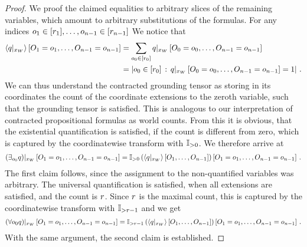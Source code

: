 \begin{proof}
    We proof the claimed equalities to arbitrary slices of the remaining variables, which amount to arbitrary substitutions of the formulas.
    For any indices $o_{1}\in[r_{1}],\ldots,o_{n-1}\in[r_{n-1}]$ We notice that
    \begin{align*}
        \left\langle {q}|_{x_{W}}\right\rangle \left[ O_{1}=o_{1},\ldots,O_{n-1}=o_{n-1} \right]
        &= \sum_{o_{0}\in[r_{0}]} {q}|_{x_{W}} \left[O_{0}=o_{0},\ldots,O_{n-1}=o_{n-1}\right] \\
        &= \left|o_{0}\in[r_{0}] \,:\, {q}|_{x_{W}} \left[O_{0}=o_{0},\ldots,O_{n-1}=o_{n-1}\right]=1\right| \, .
    \end{align*}
    We can thus understand the contracted grounding tensor as storing in its coordinates the count of the coordinate extensions to the zeroth variable, such that the grounding tensor is satisfied.
    This is analogous to our interpretation of contracted propositional formulas as world counts.
    From this it is obvious, that the existential quantification is satisfied, if the count is different from zero, which is captured by the coordinatewise transform with $\mathbb{I}_{>0}$.
    We therefore arrive at
    \begin{align*}
        {\left(\exists_{o_{0}}q\right)}|_{x_{W}} \left[O_{1}=o_{1},\ldots,O_{n-1}=o_{n-1}\right] =
        {\mathbb{I}_{>0}}\left(\left\langle {q}|_{x_{W}}\right\rangle \left[ O_{1},\ldots,O_{n-1} \right]\right)\left[O_{1}=o_{1},\ldots,O_{n-1}=o_{n-1}\right] \, .
    \end{align*}
    The first claim follows, since the assignment to the non-quantified variables was arbitrary.
    The universal quantification is satisfied, when all extensions are satisfied, and the count is $r$.
    Since $r$ is the maximal count, this is captured by the coordinatewise transform with $\mathbb{I}_{>r-1}$ and we get
    \begin{align*}
        {\left(\forall{o_{0}}q\right)}|_{x_{W}} \left[O_{1}=o_{1},\ldots,O_{n-1}=o_{n-1}\right] =
        {\mathbb{I}_{>r-1}}\left(\left\langle {q}|_{x_{W}}\right\rangle \left[ O_{1},\ldots,O_{n-1} \right]\right)\left[O_{1}=o_{1},\ldots,O_{n-1}=o_{n-1}\right] \, .
    \end{align*}
    With the same argument, the second claim is established.
\end{proof}

